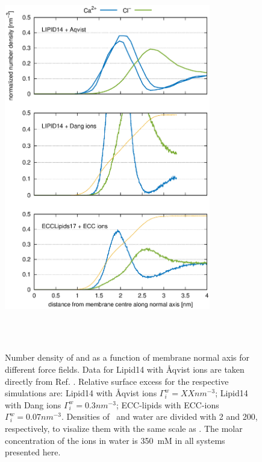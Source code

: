 \documentclass[aip,jcp,twocolumn]{revtex4}
\begin{document}
\begin{figure}[tbp]
  \centering
  \includegraphics[width=9.0cm,angle=0]{../Fig/CAdensities2.eps}
  \caption{\label{fig:cacl-dens}
    Number density of  and  as a function of membrane normal axis
    for different force fields. Data for Lipid14 with \AA{}qvist ions are taken directly from Ref. .
    Relative surface excess for the respective simulations are: 
    Lipid14 with \AA{}qvist ions $\Gamma_i^w = XX nm^{-3}$; 
    Lipid14 with Dang ions $\Gamma_i^w = 0.3 nm^{-3}$; 
    ECC-lipids with ECC-ions $\Gamma_i^w = 0.07 nm^{-3}$. 
    Densities of~ and water are divided with 2 and 200, respectively, to visalize them
    with the same scale as . The molar concentration of the ions in water is 350~mM in all systems
    presented here. 
    }
   \\
   \\
\end{figure}
\end{document}
